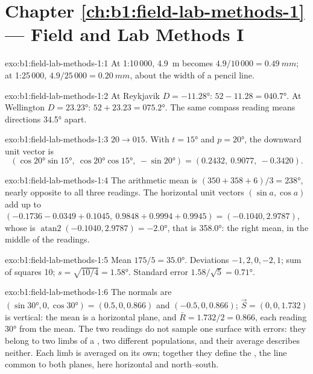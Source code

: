 \section*{Chapter \ref{ch:b1:field-lab-methods-1} --- Field and Lab Methods I}

\begin{solution}{exo:b1:field-lab-methods-1:1}
At 1:10\,000, \qty{4.9}{m} becomes $4.9/10\,000 = \qty{0.49}{mm}$; at
1:25\,000, $4.9/25\,000 = \qty{0.20}{mm}$, about the width of a pencil line.
\end{solution}

\begin{solution}{exo:b1:field-lab-methods-1:2}
At Reykjavik $D = \ang{-11.28}$: $52 - 11.28 = \ang{040.7}$. At Wellington
$D = \ang{+23.23}$: $52 + 23.23 = \ang{075.2}$. The same compass reading means
directions \ang{34.5} apart.
\end{solution}

\begin{solution}{exo:b1:field-lab-methods-1:3}
$20\to015$. With $t = \ang{15}$ and $p = \ang{20}$, the downward unit vector is
\[
  (\cos\ang{20}\sin\ang{15},\ \cos\ang{20}\cos\ang{15},\ -\sin\ang{20}) =
  (0.2432,\ 0.9077,\ -0.3420).
\]
\end{solution}

\begin{solution}{exo:b1:field-lab-methods-1:4}
The arithmetic mean is $(350 + 358 + 6)/3 = \ang{238}$, nearly opposite to
all three readings. The horizontal unit vectors $(\sin a, \cos a)$ add up to
$(-0.1736 - 0.0349 + 0.1045,\ 0.9848 + 0.9994 + 0.9945) = (-0.1040, 2.9787)$,
whose  is $\operatorname{atan2}(-0.1040, 2.9787) = \ang{-2.0}$, that
is \ang{358.0}: the right mean, in the middle of the readings.
\end{solution}

\begin{solution}{exo:b1:field-lab-methods-1:5}
Mean $175/5 = \ang{35.0}$. Deviations $-1, 2, 0, -2, 1$; sum of squares 10;
$s = \sqrt{10/4} = \ang{1.58}$. Standard error $1.58/\sqrt5 = \ang{0.71}$.
\end{solution}

\begin{solution}{exo:b1:field-lab-methods-1:6}
The normals are $(\sin\ang{30}, 0, \cos\ang{30}) = (0.5, 0, 0.866)$ and
$(-0.5, 0, 0.866)$; $\vec S = (0, 0, 1.732)$ is vertical: the mean is a
horizontal plane, and $\bar R = 1.732/2 = 0.866$, each reading \ang{30} from
the mean. The two readings do not sample one surface with errors: they belong
to two limbs of a , two different populations, and their average
describes neither. Each limb is averaged on its own; together they define the
, the line common to both planes, here horizontal and north--south.
\end{solution}

